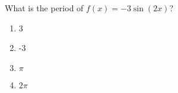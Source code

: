 \bigskip

\item What is the period of $f(x)=-3\sin(2x)$?

\begin{enumerate}
\item 3
\item -3
\item $\pi$
\item $2\pi$
\end{enumerate}

